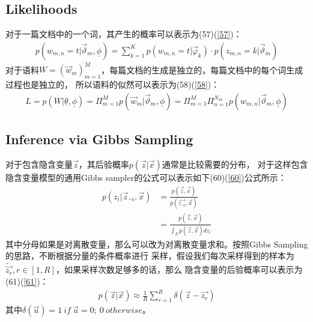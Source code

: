 \documentclass[UTF8]{ctexart}
\begin{document}
\subsection{Likelihoods}
对于一篇文档中的一个词，其产生的概率可以表示为(57)(\ref{57})：
\begin{align}
\label{57}
p(w_{m,n}=t|\vec{\vartheta}_m, \underline{\phi}) = \sum_{k=1}^K
p(w_{m,n}=t|\vec{\varphi}_k) \cdot p(z_{m,n}=k|\vec{\vartheta}_m)
\end{align}
对于语料$W=(\vec{w}_m)_{m=1}^M$，每篇文档的生成是独立的，每篇文档中的每个词生成过程也是独立的，
所以语料的似然可以表示为(58)(\ref{58})：
\begin{align}
\label{58}
L = p(W|\underline{\theta}, \underline{\phi}) = \Pi_{m=1}^M 
p(\vec{w}_m|\vec{\vartheta}_m, \underline{\phi}) = \Pi_{m=1}^M \Pi_{n=1}^{N_m}
p(w_{m,n}|\vec{\vartheta}_m, \underline{\phi})
\end{align}


\subsection{Inference via Gibbs Sampling}
对于包含隐含变量$\vec{z}$，其后验概率$p(\vec{z}|\vec{x})$通常是比较需要的分布，
对于这样包含隐含变量模型的通用Gibbs sampler的公式可以表示如下(60)(\ref{60})公式所示：
\begin{align}
\label{60}
p(z_i|\vec{z}_{\neg i}, \vec{x}) &= \frac{p(\vec{z}, \vec{x})}{p(\vec{z_{\neg i}}, \vec{x})}
\\
&= \frac{p(\vec{z},\vec{x})}{\int_{Z}p(\vec{z}, \vec{x})dz_i}
\end{align}
其中分母如果是对离散变量，那么可以改为对离散变量求和。按照Gibbs Sampling的思路，不断根据分量的条件概率进行
采样，假设我们每次采样得到的样本为$\tilde{\vec{z_r}}, r \in [1, R]$，如果采样次数足够多的话，那么
隐含变量的后验概率可以表示为(61)(\ref{61})：
\begin{align}
\label{61}
p(\vec{z}|\vec{x}) \approx \frac{1}{R}\sum_{r=1}^R \delta(\vec{z} - \vec{z_r})
\end{align}
其中$\delta(\vec{u}) = {1 \ if \ \vec{u}=0;\  0 \  otherwise}$。
\end{document}
